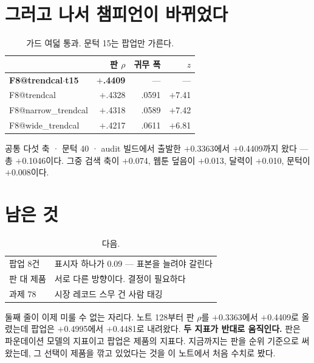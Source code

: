 \documentclass[10pt]{article}
\begin{document}


\section{그러고 나서 챔피언이 바뀌었다}

\begin{table}[t]
\centering\tsize
\caption{가드 여덟 통과. 문턱 15는 팝업만 가른다.}
\begin{tabular}{lrrr}
\toprule
& 판 $\rho$ & 귀무 폭 & $z$ \\
\midrule
\textbf{F8@trendcal$\cdot$t15} & \textbf{$+$.4409} & --- & --- \\
F8@trendcal & $+$.4328 & .0591 & $+$7.41 \\
F8@narrow\_trendcal & $+$.4318 & .0589 & $+$7.42 \\
F8@wide\_trendcal & $+$.4217 & .0611 & $+$6.81 \\
\bottomrule
\end{tabular}
\end{table}

공통 다섯 축 · 문턱 40 · audit 빌드에서 출발한 $+$0.3363에서
$+$0.4409까지 왔다 --- 총 $+$0.1046이다. 그중 검색 축이 $+$0.074,
웹툰 덮음이 $+$0.013, 달력이 $+$0.010, 문턱이 $+$0.008이다.


\section{남은 것}

\begin{table}[t]
\centering\tsize
\caption{다음.}
\begin{tabular}{ll}
\toprule
팝업 8건 & 표시자 하나가 0.09 --- 표본을 늘려야 갈린다 \\
판 대 제품 & 서로 다른 방향이다. 결정이 필요하다 \\
과제 78 & 시장 레코드 스무 건 사람 태깅 \\
\bottomrule
\end{tabular}
\end{table}

둘째 줄이 이제 미룰 수 없는 자리다. 노트 128부터 판 $\rho$를 $+$0.3363에서
$+$0.4409로 올렸는데 팝업은 $+$0.4995에서 $+$0.4481로 내려왔다.
\textbf{두 지표가 반대로 움직인다.} 판은 파운데이션 모델의 지표이고 팝업은
제품의 지표다. 지금까지는 판을 순위 기준으로 써 왔는데, 그 선택이 제품을
깎고 있었다는 것을 이 노트에서 처음 수치로 봤다.
\end{document}
